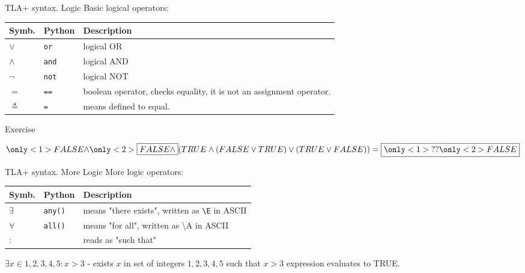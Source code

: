 \documentclass[12pt]{beamer}
\begin{document}
  \begin{frame}{TLA+ syntax. Logic}
      Basic logical operators:
        \begin{table}
        \centering
            \begin{tabular}{@{} llp{7cm} @{}}
                Symb.       & Python & Description   \\ \hline
                $\lor$      & \texttt{or} &logical OR \\
                $\land$     & \texttt{and} &logical AND \\
                $\lnot$     & \texttt{not} &logical NOT \\
                $=$         & \texttt{==} & boolean operator, checks equality, it is not an assignment operator. \\
                $\triangleq$& \texttt{=} & means defined to equal.

            \end{tabular}
        \end{table}

  \end{frame}
  \begin{frame}{Exercise}
    \begin{center}
        $ \only<1>{FALSE \land}\only<2>{\boxed{FALSE \land}} (TRUE \land (FALSE \lor TRUE) \lor (TRUE \lor FALSE)) =  \boxed{\only<1>{??}\only<2>{FALSE}}$
    \end{center}
  \end{frame}
  \begin{frame}{TLA+ syntax. More Logic}
      More logic operators:
        \begin{table}
        \centering
            \begin{tabular}{@{} llp{7cm} @{}}
                Symb.  & Python & Description   \\ \hline
                $\exists$ & \texttt{any()} & means "there exists", written as \texttt{\textbackslash E} in ASCII \\
                $\forall$ & \texttt{all()} & means "for all", written as \textbackslash A in ASCII \\
                $:$       &                            & reads as "such that"
            \end{tabular}
        \end{table}

      $\exists x \in {1,2,3,4,5} : x > 3$ - exists $x$ in
      set of integers ${1,2,3,4,5}$ such that $x > 3$ expression evaluates
      to TRUE.
  \end{frame}
\end{document}
